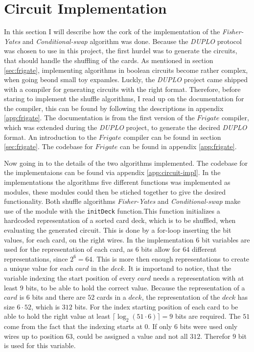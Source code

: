 \documentclass[twoside,11pt,openright]{report}
\newcommand{\FY}{\textit{Fisher-Yates} }
\newcommand{\CS}{\textit{Conditional-swap} }
\newcommand{\DUPLO}{\textit{DUPLO} }
\begin{document}
\section{Circuit Implementation}
\label{sec:cir_imp}
In this section I will describe how the cork of the implementation of the \FY and \CS algorithm was done. Because the \DUPLO protocol was chosen to use in this project, the first hurdel was to generate the circuits, that should handle the shuffling of the cards. As mentioned in section \ref{sec:frigate}, implementing algorithms in boolean circuits become rather complex, when going beond small toy expamles. Luckly, the \DUPLO project came shipped with a compiler for generating circuits with the right format. Therefore, before staring to implement the shuffle algorithms, I read up on the documentation for the compiler, this can be found by following the descriptions in appendix \ref{app:frigate}. The documentation is from the first version of the $Frigate$ compiler, which was extended during the \DUPLO project, to generate the decired \DUPLO format. An introduction to the $Frigate$ compiler can be found in section \ref{sec:frigate}. The codebase for $Frigate$ can be found in appendix \ref{app:frigate}.

\bigskip

Now going in to the details of the two algorithms implemented. The codebase for the implementaions can be found via appendix \ref{app:circuit-impl}. In the implementations the algorithms five different functions was implemented as modules, these modules could then be stiched together to give the desired functionality. Both shuffle algorithms \FY and \CS make use of the module with the \verb|initDeck| function.This function initializes a hardcoded representation of a sorted card deck, which is to be shuffled, when evaluating the generated circuit. This is done by a for-loop inserting the bit values, for each card, on the right wires. In the implementation $6$ bit variables are used for the representation of each card, as $6$ bits allow for $64$ different representations, since $2^6=64$. This is more then enough representations to create a unique value for each $card$ in the $deck$. It is importand to notice, that the variable indexing the start position of every $card$ needs a representation with at least $9$ bits, to be able to hold the correct value. Because the representation of a $card$ is $6$ bits and there are $52$ cards in a $deck$, the representation of the $deck$ has size $6\cdot52$, which is $312$ bits. For the index starting position of each card to be able to hold the right value at least $\lceil \log_2(51\cdot 6)\rceil=9$ bits are required. The $51$ come from the fact that the indexing starts at $0$. If only $6$ bits were used only wires up to position $63$, could be assigned a value and not all $312$. Therefor $9$ bit is used for this variable.
\end{document}
